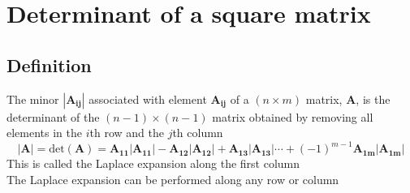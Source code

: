 \documentclass[a4paper, 11pt, normalem]{report}
\begin{document}
\section{Determinant of a square matrix}
\subsection{Definition}
The minor $\mathbf{|A_{ij}|}$ associated with element $\mathbf{A_{ij}}$ of a $(n \times m)$ matrix, $\mathbf{A}$, is the determinant of the $(n - 1) \times (n - 1)$ matrix obtained by removing all elements in the $i$th row and the $j$th column
\begin{equation*}
    |\mathbf{A}| = \text{det}(\mathbf{A}) = \mathbf{A_{11}|A_{11}|} - \mathbf{A_{12}|A_{12}|} + \mathbf{A_{13}|A_{13}|} \cdots + (-1)^{m - 1} \mathbf{A_{1m}|A_{1m}|}
\end{equation*}
This is called the Laplace expansion along the first column \\
The Laplace expansion can be performed along any row or column
\end{document}
